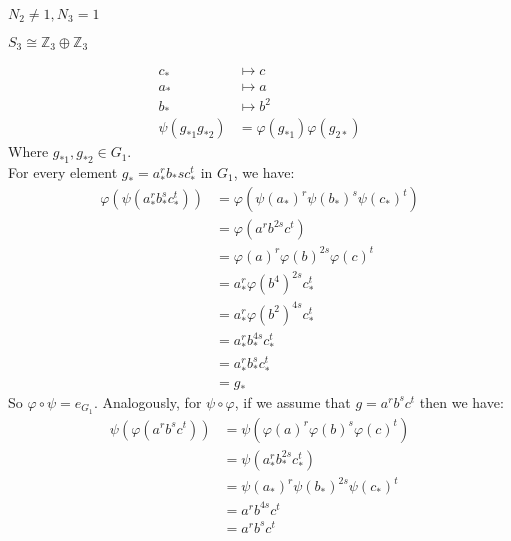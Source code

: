 \documentclass[a4paper,14pt]{article}
\begin{document}
\begin{enumerate}
\begin{item}{$N_2 \neq 1, N_3 = 1$}
\begin{enumerate}
\begin{item}{$S_3\cong \mathbb{Z}_3 \oplus \mathbb{Z}_3$}
\begin{enumerate}
\begin{align*}
                                c_* &\longmapsto c\\
                                a_* &\longmapsto a\\
                                b_* &\longmapsto b^2\\
                                \psi(g_{*1}g_{*2}) &= \varphi(g_{*1})\varphi(g_{2*})
                            \end{align*}
                            Where $g_{*1},g_{*2} \in G_1$.\\
                            For every element $g_*=a_*^rb_*sc_*^t$ in $G_1$, we have:
                            \begin{align*}
                                \varphi(\psi(a_*^rb_*^sc_*^t)) &= \varphi(\psi(a_*)^r\psi(b_*)^s\psi(c_*)^t)\\
                                                            &= \varphi(a^rb^{2s}c^t)\\
                                                            &= \varphi(a)^r\varphi(b)^{2s}\varphi(c)^t\\
                                                            &= a_*^r\varphi(b^4)^{2s}c_*^t\\
                                                            &= a_*^r\varphi(b^2)^{4s}c_*^t\\
                                                            &= a_*^rb_*^{4s}c_*^t\\
                                                            &= a_*^rb_*^sc_*^t\\
                                                            &= g_*
                            \end{align*}  
                            So $\varphi \circ \psi = e_{G_1}$. Analogously, for $\psi \circ \varphi$, if we assume that $g = a^rb^sc^t$
                            then we have:
                            \begin{align*}
                                \psi(\varphi(a^rb^sc^t)) &= \psi(\varphi(a)^r\varphi(b)^s\varphi(c)^t)\\
                                                        &= \psi(a_*^rb_*^{2s}c_*^t)\\
                                                        &= \psi(a_*)^r\psi(b_*)^{2s}\psi(c_*)^t\\
                                                        &= a^rb^{4s}c^t\\
                                                        &= a^rb^sc^t\\

\end{align*}
\end{enumerate}
\end{item}
\end{enumerate}
\end{item}
\end{enumerate}
\end{document}
